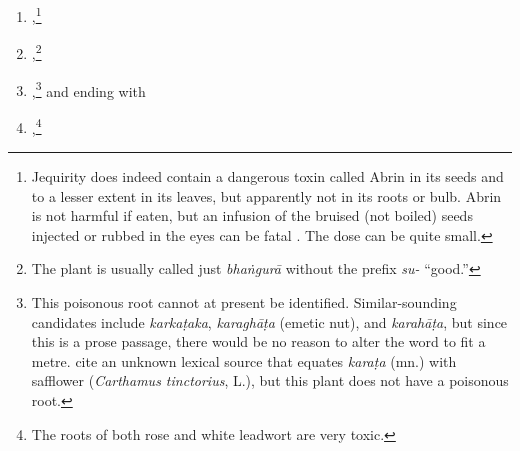 \begin{translation}
\begin{itemize}
\begin{enumerate}
        \item {},\footnote{Jequirity does indeed contain a dangerous
toxin called Abrin in its seeds and to a lesser extent in its leaves,
but apparently not in its roots or bulb. Abrin is not harmful if eaten,
but an infusion of the bruised (not boiled) seeds injected or rubbed in
the eyes can be fatal \citep[\# 6]{NK}.  The dose can be quite small.}
        
        \item {},\footnote{The plant is
usually called just \emph{bhaṅgurā} without the prefix \emph{su-} “good.”}
        

        \item {},\footnote{This poisonous root cannot at present
be identified.  Similar-sounding candidates include \emph{karkaṭaka},
\emph{karaghāṭa} (emetic nut), and \emph{karahāṭa}, but since this is a
prose passage, there would be no reason to alter the word to fit a metre.
\citet[255]{moni-sans} cite an unknown lexical source that equates
\emph{karaṭa} (mn.) with safflower (\emph{Carthamus tinctorius}, L.), but
this plant does not have a poisonous root.} %
%
%
%
%
and ending with \item {},\footnote{The roots of both rose and white leadwort are very toxic.} 


\end{enumerate}
\end{itemize}
\end{translation}
